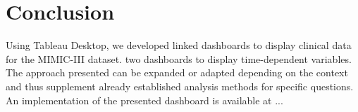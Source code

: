 \documentclass[aac,crcready]{iosart2x}
\begin{document}
\section{Conclusion}\label{s6}
Using Tableau Desktop, we developed linked dashboards to display clinical data for the MIMIC-III dataset. two dashboards to display time-dependent variables. The approach presented can be expanded or adapted depending on the context and thus supplement already established analysis methods for specific questions. An implementation of the presented dashboard is available at ...








\nocite{*} 

%
\end{document}
